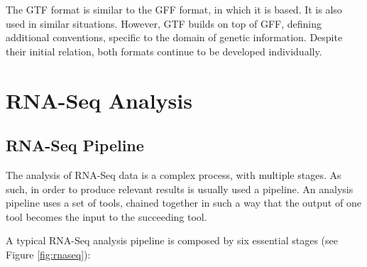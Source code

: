The GTF format is similar to the GFF format, in which it is based. It is also
used in similar situations. However, GTF builds on top of GFF, defining
additional conventions, specific to the domain of genetic information. Despite
their initial relation, both formats continue to be developed individually.

\section{RNA-Seq Analysis}


\subsection{RNA-Seq Pipeline}

The analysis of RNA-Seq data is a complex process, with multiple stages. As
such, in order to produce relevant results is usually used a pipeline. An
analysis pipeline uses a set of tools, chained together in such a way that the
output of one tool becomes the input to the succeeding tool.

A typical RNA-Seq analysis pipeline is composed by six essential stages
\cite{rnaseqpipeline} (see Figure \ref{fig:rnaseq}):

